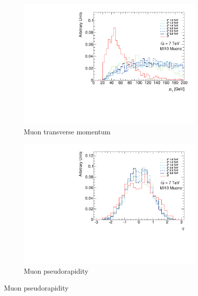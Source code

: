 \begin{figure}[htbp]
  \centering
  \begin{subfigure}{0.48\textwidth}
    \includegraphics[width=\textwidth]{PartBoosted/Plots/h_mi10_pt.pdf}
    \caption{Muon transverse momentum}\label{fig:BoostedControlMI10Pt}
  \end{subfigure}
  \begin{subfigure}{0.48\textwidth}
    \includegraphics[width=\textwidth]{PartBoosted/Plots/h_mi10_eta.pdf}
    \caption{Muon pseudorapidity}\label{fig:BoostedControlMI10Eta}
  \end{subfigure}


\end{figure}
